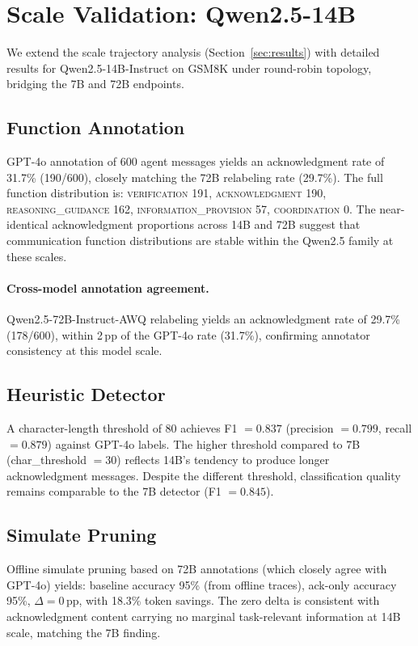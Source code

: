 \section{Scale Validation: Qwen2.5-14B}
\label{app:scaling}

We extend the scale trajectory analysis (Section~\ref{sec:results}) with detailed results for Qwen2.5-14B-Instruct on GSM8K under round-robin topology, bridging the 7B and 72B endpoints.

\subsection{Function Annotation}

GPT-4o annotation of 600 agent messages yields an acknowledgment rate of 31.7\% (190/600), closely matching the 72B relabeling rate (29.7\%). The full function distribution is: \textsc{verification} 191, \textsc{acknowledgment} 190, \textsc{reasoning\_guidance} 162, \textsc{information\_provision} 57, \textsc{coordination} 0. The near-identical acknowledgment proportions across 14B and 72B suggest that communication function distributions are stable within the Qwen2.5 family at these scales.

\paragraph{Cross-model annotation agreement.} Qwen2.5-72B-Instruct-AWQ relabeling yields an acknowledgment rate of 29.7\% (178/600), within 2\,pp of the GPT-4o rate (31.7\%), confirming annotator consistency at this model scale.

\subsection{Heuristic Detector}

A character-length threshold of 80 achieves F1 $= 0.837$ (precision $= 0.799$, recall $= 0.879$) against GPT-4o labels. The higher threshold compared to 7B (char\_threshold $= 30$) reflects 14B's tendency to produce longer acknowledgment messages. Despite the different threshold, classification quality remains comparable to the 7B detector (F1 $= 0.845$).

\subsection{Simulate Pruning}

Offline simulate pruning based on 72B annotations (which closely agree with GPT-4o) yields: baseline accuracy 95\% (from offline traces), ack-only accuracy 95\%, $\Delta = 0$\,pp, with 18.3\% token savings. The zero delta is consistent with acknowledgment content carrying no marginal task-relevant information at 14B scale, matching the 7B finding.

